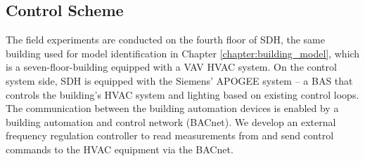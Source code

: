 



%




\subsection{Control Scheme}\label{sec:control_scheme}
The field experiments are conducted on the fourth floor of SDH, the same building used for model identification in Chapter \ref{chapter:building_model}, which is a seven-floor-building equipped with a VAV HVAC system.
On the control system side, SDH is equipped with the Siemens' APOGEE system -- a BAS that controls the building's HVAC system and lighting based on existing control loops. %
The communication between the building automation devices is enabled by a building automation and control network (BACnet). 
We develop an external frequency regulation controller to read measurements from and send control commands to the HVAC equipment via the BACnet. 

